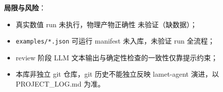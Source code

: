 \documentclass[UTF8]{ctexart}
\begin{document}
\begin{warnbox}
\textbf{局限与风险}：
\begin{itemize}
\item 真实数值 run 未执行，物理产物正确性 \textcolor{warn}{未验证}（缺数据）；
\item \texttt{examples/*.json} 可运行 manifest 未入库，\textcolor{warn}{未验证} run 全流程；
\item review 阶段 LLM 文本输出与确定性检查的一致性仅靠提示约束；
\item 本库非独立 git 仓库，git 历史不能独立反映 lamet-agent 演进，以 PROJECT\_LOG.md 为准。
\end{itemize}
\end{warnbox}
\end{document}
